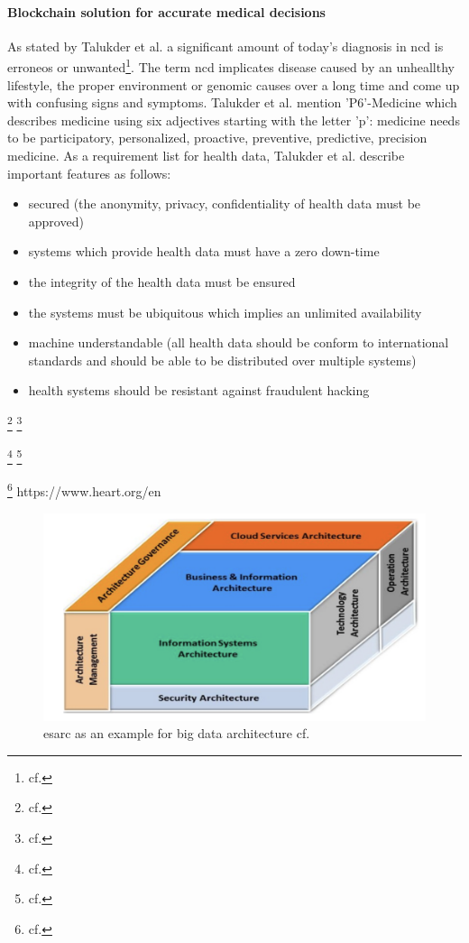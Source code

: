 \paragraph{Blockchain solution for accurate medical decisions}
As stated by Talukder et al. a significant amount of today's diagnosis in \ac{ncd} is erroneos or unwanted\footnote{cf.\autocite{talukder}}. The term \ac{ncd} implicates disease caused by an unheallthy lifestyle, the proper environment or genomic causes over a long time and come up with confusing signs and symptoms.
Talukder et al. mention 'P6'-Medicine which describes medicine using six adjectives starting with the letter 'p': medicine needs to be participatory, personalized, proactive, preventive, predictive, precision medicine.
As a requirement list for health data, Talukder et al. describe important features as follows: 

\begin{itemize}
\setlength\itemsep{-0.5em}
  \item secured (the anonymity, privacy, confidentiality of health data must be approved)
  \item systems which provide health data must have a zero down-time 
  \item the integrity of the health data must be ensured
  \item the systems must be ubiquitous which implies an unlimited availability
  \item machine understandable (all health data should be conform to international standards and should be able to be distributed over multiple systems)
  \item health systems should be resistant against fraudulent hacking
\end{itemize}


\footnote{cf.\autocite{kawohl}}
\footnote{cf.\autocite{zimmermann}}

\footnote{cf.\autocite{white_blood_2007}}
\footnote{cf.\autocite{beevers_blood_2001}}

\footnote{cf.\autocite{alessa}}
https://www.heart.org/en

\begin{figure}[htbp]
	\centering
	\includegraphics[width=1\textwidth]{images/esarc_cube.png}
	\caption{\ac{esarc} as an example for big data architecture cf.\autocite{zimmermann}}
	\label{vp_architecture}
\end{figure}

